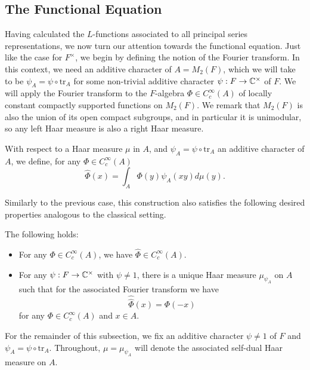 \subsection{The Functional Equation}

Having calculated the $L$-functions associated to all principal series representations, we now turn our attention towards the functional equation. Just like the case for $F^\times$, we begin by defining the notion of the Fourier transform. In this context, we need an additive character of $A=M_2(F)$, which we will take to be $\psi_A = \psi \circ \mathrm{tr}_A$ for some non-trivial additive character $\psi : F \to \mathbb{C}^\times$ of $F$. We will apply the Fourier transform to the $F$-algebra $\Phi \in C_c^\infty(A)$ of locally constant compactly supported functions on $M_2(F)$. We remark that $M_2(F)$ is also the union of its open compact subgroups, and in particular it is unimodular, so any left Haar measure is also a right Haar measure.

\begin{defn}
    With respect to a Haar measure $\mu$ in $A$, and $\psi_A=\psi \circ \mathrm{tr}_A$ an additive character of $A$, we define, for any $\Phi \in C_c^\infty(A)$
    $$\hat{\Phi}(x) = \int_A\Phi(y) \psi_A(xy)d\mu(y).$$
\end{defn}

Similarly to the previous case, this construction also satisfies the following desired properties analogous to the classical setting.

\begin{prop}
    The following holds:
    \begin{itemize}
        \item For any $\Phi \in C_c^\infty(A)$, we have $\hat{\Phi} \in C_c^\infty(A)$.
        \item For any $\psi: F \to \mathbb{C}^\times$ with $\psi \neq 1$, there is a unique Haar measure $\mu_{\psi_A}$ on $A$ such that for the associated Fourier transform we have $$\hat{\hat{\Phi}}(x) = \Phi(-x)$$ for any $\Phi \in C_c^\infty(A)$ and $x \in A$.
    \end{itemize}
    
\end{prop}

\begin{notn}
    For the remainder of this subsection, we fix an additive character $\psi \neq 1$ of $F$ and $\psi_A = \psi \circ \mathrm{tr}_A$. Throughout, $\mu= \mu_{\psi_A}$ will denote the associated self-dual Haar measure on $A$.
\end{notn}

